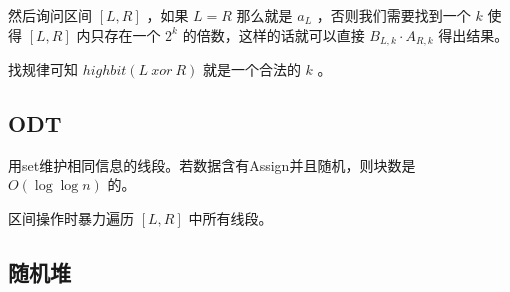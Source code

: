 然后询问区间 $[L,R]$ ，如果 $L=R$ 那么就是 $a_L$ ，否则我们需要找到一个 $k$ 使得 $[L,R]$ 内只存在一个 $2^k$ 的倍数，这样的话就可以直接 $B_{L,k}\cdot A_{R,k}$ 得出结果。

找规律可知 $highbit(L\ xor\ R)$ 就是一个合法的 $k$ 。



\subsection{ODT}

用set维护相同信息的线段。若数据含有Assign并且随机，则块数是 $O(\log\log n)$ 的。

区间操作时暴力遍历 $[L,R]$ 中所有线段。



\newpage

\subsection{随机堆}




